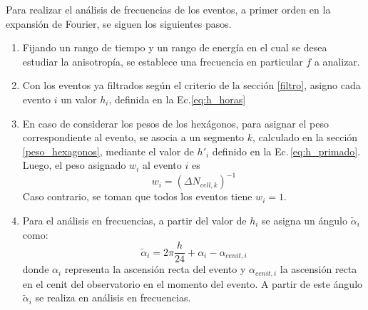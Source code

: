   Para realizar el análisis de frecuencias de los eventos, a primer orden en la expansión de Fourier, se siguen los siguientes pasos.

        \begin{enumerate}
        \item Fijando un rango de tiempo y un rango de energía en el cual se desea estudiar la anisotropía, se establece una frecuencia en particular $f$ a analizar.

        \item Con los eventos ya filtrados según el criterio de la sección \ref{filtro}, asigno cada evento $i$ un valor $h_i$, definida en la Ec.\ref{eq:h_horas}

        \item En caso de considerar los pesos de los hexágonos, para asignar el peso correspondiente al evento, se asocia a un segmento $k$, calculado en la sección \ref{peso_hexagonos}, mediante el valor de $h'_i$ definido en la Ec.\,\ref{eq:h_primado}. Luego, el peso asignado $w_i$  al evento $i$ es
        \begin{equation*}
           w_{i}= (\Delta N_{cell,k})^{-1}
        \end{equation*} 
        Caso contrario, se toman que todos los eventos tiene $w_i=1$.
        
        \item Para el análisis en frecuencias, a partir del valor de $h_i$ se asigna un ángulo $\tilde{\alpha}_i$ como:
        \begin{equation}
         \tilde{\alpha}_i = 2\pi \frac{h}{24} + \alpha_i -\alpha_{cenit,i}
        \end{equation}
        donde $\alpha_i$  representa la ascensión recta del evento y $\alpha_{cenit,i}$ la ascensión recta en el cenit del observatorio en el momento del evento. A partir de este ángulo $\tilde{\alpha}_i$ se realiza en análisis en frecuencias.


\end{enumerate}
